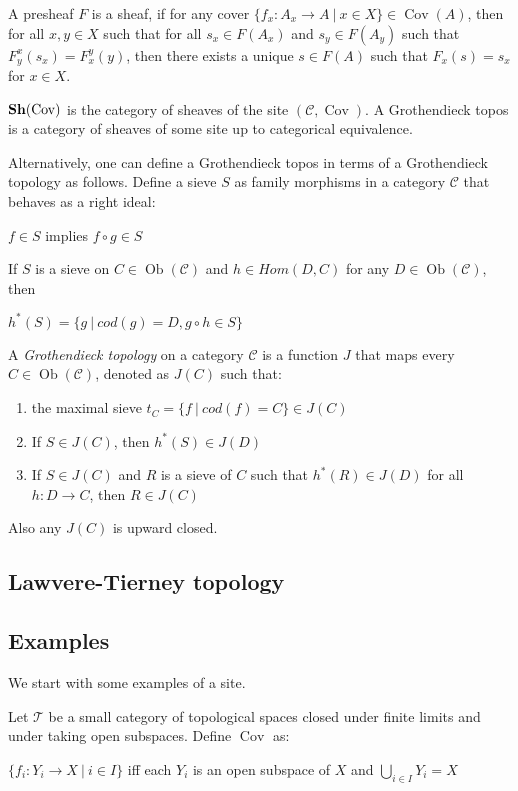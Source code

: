 \documentclass[a4paper]{article}
\theoremstyle{defin}
\theoremstyle{theorem}
\theoremstyle{claim}
\theoremstyle{prop}
\theoremstyle{lemma}
\theoremstyle{fact}
\theoremstyle{ex}
\theoremstyle{col}
\begin{document}
A presheaf $F$ is a sheaf, if for any cover $\{ f_x : A_x \to A \: | \: x \in X \} \in \operatorname{Cov}(A)$, then for all $x, y \in X$ such that for all $s_x \in F(A_x)$ and $s_y \in F(A_y)$ such that $F^x_y(s_x) = F^y_x(y)$, then there exists a unique $s \in F(A)$ such that $F_x(s) = s_x$ for $x \in X$.

${\bf Sh}(\operatorname{Cov})$ is the category of sheaves of the site $(\mathcal{C}, \operatorname{Cov})$. A Grothendieck topos is a category of sheaves of some site up to categorical equivalence.

Alternatively, one can define a Grothendieck topos in terms of a Grothendieck topology as follows. Define a sieve $S$
as family morphisms in a category $\mathcal{C}$ that behaves as a right ideal:

\begin{center}
$f \in S$ implies $f \circ g \in S$
\end{center}

If $S$ is a sieve on $C \in \operatorname{Ob}(\mathcal{C})$ and $h \in Hom(D, C)$ for any $D \in \operatorname{Ob}(\mathcal{C})$, then
\begin{center}
$h^*(S) = \{ g \: | \: cod(g) = D, g \circ h \in S \}$
\end{center}

A \emph{Grothendieck topology} on a category $\mathcal{C}$ is a function $J$ that maps every $C \in \operatorname{Ob}(\mathcal{C})$, denoted as $J(C)$ such that:
\begin{enumerate}
\item the maximal sieve $t_C = \{ f \: | \: cod(f) = C\} \in J(C)$
\item If $S \in J(C)$, then $h^*(S) \in J(D)$
\item If $S \in J(C)$ and $R$ is a sieve of $C$ such that $h^*(R) \in J(D)$ for all $h : D \to C$, then $R \in J(C)$
\end{enumerate}
Also any $J(C)$ is upward closed.

\subsection{Lawvere-Tierney topology}

\subsection{Examples}

We start with some examples of a site.

Let $\mathcal{T}$ be a small category of topological spaces closed under finite limits and under taking open subspaces. Define $\operatorname{Cov}$ as:
\begin{center}
$\{ f_i : Y_i \to X \: | \: i \in I \}$ iff each $Y_i$ is an open subspace of $X$ and $\bigcup \limits_{i \in I} Y_i = X$
\end{center}
\end{document}
